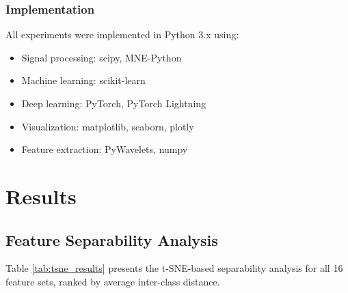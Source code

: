 \documentclass[conference]{IEEEtran}
\begin{document}
\subsubsection{Implementation}
All experiments were implemented in Python 3.x using:
\begin{itemize}
    \item Signal processing: scipy, MNE-Python
    \item Machine learning: scikit-learn
    \item Deep learning: PyTorch, PyTorch Lightning
    \item Visualization: matplotlib, seaborn, plotly
    \item Feature extraction: PyWavelets, numpy
\end{itemize}

\section{Results}

\subsection{Feature Separability Analysis}

Table \ref{tab:tsne_results} presents the t-SNE-based separability analysis for all 16 feature sets, ranked by average inter-class distance.
\end{document}

